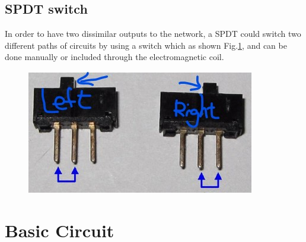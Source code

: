 \documentclass[a4paper, 12pt, AutoFakeBold]{report}
\newcommand{\figref}[1]{Fig.\ref{#1}}
\begin{document}
    \section{SPDT switch}
    In order to have two dissimilar outputs to the network, a SPDT could switch two different paths of circuits by using a switch which as shown \figref{fig:1.5}, and can be done manually or included through the electromagnetic coil.
    \begin{figure}[H]
        \centering
        \includegraphics[scale=1]{figs/Fig1-5.jpg}
        \caption{}
        \label{fig:1.5}
    \end{figure}

    \chapter{Basic Circuit}
\end{document}
